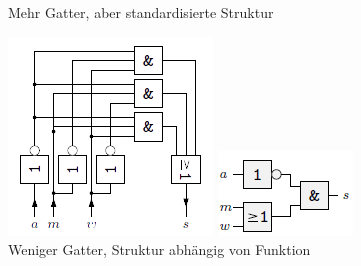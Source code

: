 \documentclass[12pt]{report}
\begin{document}
\begin{figure}[H]
  \begin{minipage}[t]{0.4\textwidth}
    \caption{Mehr Gatter, aber standardisierte Struktur}
    \includegraphics[width=\textwidth]{../graphics/PLA_example_normal.png}
  \end{minipage}
  \hfill
  \begin{minipage}[t]{0.4\textwidth}
    \caption{Weniger Gatter, Struktur abhängig von Funktion}
    \centering
    \includegraphics[width=\textwidth]{../graphics/PLA_example_original.png}
  \end{minipage}
\end{figure}
\end{document}
